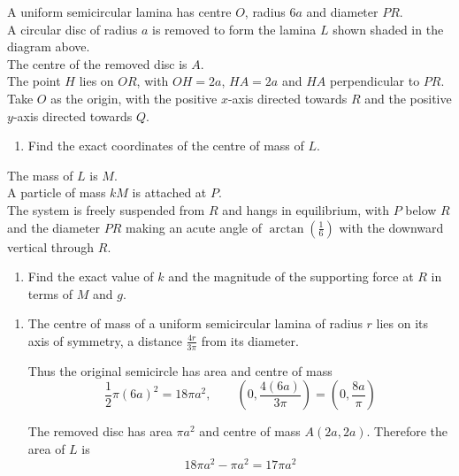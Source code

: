 \documentclass[leqno]{article}
\begin{document}
\begin{enumerate}[
  label=\textbf{\arabic*.},
  leftmargin=*,
  topsep=0pt,
  partopsep=0pt,
  parsep=0pt
]
A uniform semicircular lamina has centre $O$, radius $6a$ and diameter $PR$. \\
A circular disc of radius $a$ is removed to form the lamina $L$ shown shaded in the diagram above. \\
The centre of the removed disc is $A$. \\
The point $H$ lies on $OR$, with $OH=2a$, $HA=2a$ and $HA$ perpendicular to $PR$. \\

Take $O$ as the origin, with the positive $x$-axis directed towards $R$ and the positive $y$-axis directed towards $Q$. \\
\begin{enumerate}[label=\textbf{(\alph*)}]
\item Find the exact coordinates of the centre of mass of $L$.  \\
\end{enumerate}
The mass of $L$ is $M$. \\
A particle of mass $kM$ is attached at $P$. \\
The system is freely suspended from $R$ and hangs in equilibrium, with $P$ below $R$ and the diameter $PR$ making an acute angle of $\arctan\left(\frac{1}{6}\right)$ with the downward vertical through $R$. \\
\begin{enumerate}[label=\textbf{(\alph*)}, resume]
\item Find the exact value of $k$ and the magnitude of the supporting force at $R$ in terms of $M$ and $g$.  \\
\end{enumerate}

\vspace*{10pt}

\begin{djsSolution}
\begin{enumerate}[label=\textbf{(\alph*)}, start=1]
\item The centre of mass of a uniform semicircular lamina of radius \(r\) lies on its axis of symmetry, a distance \(\frac{4r}{3\pi}\) from its diameter.

Thus the original semicircle has area and centre of mass
\[
\dfrac12\pi(6a)^2=18\pi a^2,
\qquad
\left(0,\dfrac{4(6a)}{3\pi}\right)=\left(0,\dfrac{8a}{\pi}\right)
\]

The removed disc has area \(\pi a^2\) and centre of mass \(A(2a,2a)\). Therefore the area of \(L\) is
\[
18\pi a^2-\pi a^2=17\pi a^2
\]


\end{enumerate}
\end{djsSolution}
\end{enumerate}
\end{document}
